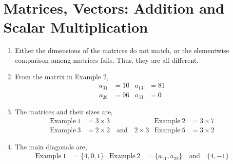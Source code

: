 \section{Matrices, Vectors: Addition and Scalar Multiplication}
\begin{enumerate}
    \item Either the dimensions of the matrices do not match, or the elementwise
          comparison among matrices fails. Thus, they are all different.

    \item From the matrix in Example 2,
          \begin{align}
              a_{31} & = 10 & a_{13} & = 81 \\
              a_{26} & = 96 & a_{33} & = 0
          \end{align}

    \item The matrices and their sizes are,
          \begin{align}
              \text{Example}\ 1 & = 3 \times 3                                   &
              \text{Example}\ 2 & = 3 \times 7                                     \\
              \text{Example}\ 3 & = 2 \times 2 \quad \text{and} \quad 2 \times 3 &
              \text{Example}\ 5 & = 3 \times 2
          \end{align}

    \item The main diagonals are,
          \begin{align}
              \text{Example}\ 1 & = \{4, 0, 1\}                         &
              \text{Example}\ 2 & = \{a_{11}, a_{22}\} \quad \text{and}
              \quad \{4, -1\}
          \end{align}


\end{enumerate}
